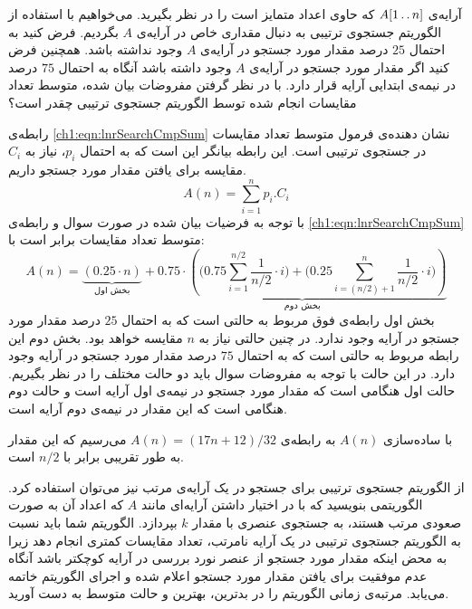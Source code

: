 { آرایه‌ی {$A[1\mathinner{\ldotp\ldotp} n]$} که حاوی اعداد متمایز است را در نظر بگیرید. می‌خواهیم با استفاده از الگوریتم جستجوی ترتیبی به دنبال مقداری خاص در آرایه‌ی {$A$} بگردیم. فرض کنید به احتمال {$25$} درصد مقدار مورد جستجو در آرایه‌ی {$A$} وجود نداشته باشد. همچنین فرض کنید اگر مقدار مورد جستجو در آرایه‌ی {$A$} وجود داشته باشد آنگاه به احتمال {$75$} درصد در نیمه‌ی ابتدایی آرایه قرار دارد. با در نظر گرفتن مفروضات بیان شده، متوسط تعداد مقایسات انجام ‌شده توسط الگوریتم جستجوی ترتیبی چقدر است؟


رابطه‌ی {\eqref{ch1:eqn:lnrSearchCmpSum}} نشان دهنده‌ی فرمول متوسط تعداد مقایسات در جستجوی ترتیبی است. این رابطه بیانگر این است که به احتمال {$p_i$}، نیاز به {$C_i$} مقایسه برای یافتن مقدار مورد جستجو داریم.
\begin{equation}
A(n) = \sum_{i=1}^{n}{p_i . C_i}\label{ch1:eqn:lnrSearchCmpSum}
\end{equation}
با توجه به فرضیات بیان شده در صورت سوال و رابطه‌ی {\eqref{ch1:eqn:lnrSearchCmpSum}} متوسط تعداد مقایسات برابر است با:
\begin{displaymath}
A(n) = \underbrace{\left( 0.25\cdot n\right)}_{\text{بخش اول}} +
\underbrace{0.75\cdot\left(\biggl( 0.75\sum_{i=1}^{n/2}{\frac{1}{n/2} \cdot i} \biggr) + \biggl( 0.25\sum_{i=(n/2)+1}^{n}{\frac{1}{n/2}\cdot i} \biggr) \right) }_{\text{بخش دوم}}
\end{displaymath}
بخش اول رابطه‌ی فوق مربوط به حالتی است که به احتمال {$25$} درصد مقدار مورد جستجو در آرایه وجود ندارد. در چنین حالتی نیاز به {$n$} مقایسه خواهد بود. بخش دوم این رابطه مربوط به حالتی است که به احتمال {$75$} درصد مقدار مورد جستجو در آرایه وجود دارد. در این حالت با توجه به مفروضات سوال باید دو حالت مختلف را در نظر بگیریم. حالت اول هنگامی است که مقدار مورد جستجو در نیمه‌ی اول آرایه است و حالت دوم هنگامی است که این مقدار در نیمه‌ی دوم آرایه است.

با ساده‌سازی {$A(n)$} به رابطه‌ی {$A(n)=(17n+12)/32$} می‌رسیم که این مقدار به طور تقریبی برابر با {$n/2$} است.

 از الگوریتم جستجوی ترتیبی برای جستجو در یک آرایه‌ی مرتب نیز می‌توان استفاده کرد. الگوریتمی بنویسید که با در اختیار داشتن آرایه‌ای مانند {$A$}  که اعداد آن به صورت صعودی مرتب هستند، به جستجوی عنصری با مقدار {$k$} بپردازد. الگوریتم شما باید نسبت به الگوریتم جستجوی ترتیبی در یک آرایه نامرتب، تعداد مقایسات کمتری انجام دهد زیرا به محض اینکه مقدار مورد جستجو از عنصر نورد بررسی در آرایه کوچکتر باشد آنگاه عدم موفقیت برای یافتن مقدار مورد جستجو اعلام شده و اجرای الگوریتم خاتمه می‌یابد. مرتبه‌ی زمانی الگوریتم را در بدترین، بهترین و حالت متوسط به دست آورید.

}
